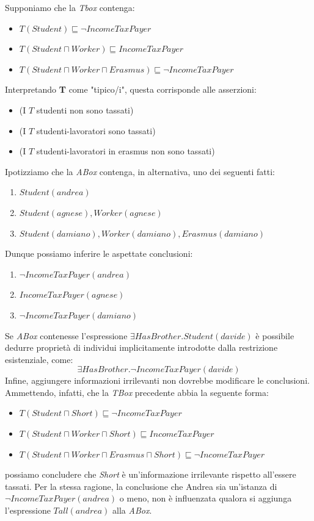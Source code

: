 Supponiamo che la \textit{Tbox} contenga:
\begin{itemize}
	\item[] $ T(Student) \sqsubseteq \neg IncomeTaxPayer$
	\item[] $ T(Student \sqcap Worker) \sqsubseteq IncomeTaxPayer$
	\item[] $ T(Student \sqcap Worker \sqcap Erasmus) \sqsubseteq \neg IncomeTaxPayer $
\end{itemize}
Interpretando \textbf{T} come "tipico/i", questa corrisponde alle asserzioni:
\begin{itemize}
	\item[] (I $T$ studenti non sono tassati)
	\item[] (I $T$ studenti-lavoratori sono tassati)
	\item[] (I $T$ studenti-lavoratori in erasmus non sono tassati)
\end{itemize}
Ipotizziamo che la \textit{ABox} contenga, in alternativa, uno dei seguenti fatti:
\begin{enumerate}
	\item $ Student(andrea) $
	\item $ Student(agnese), Worker(agnese) $
	\item $ Student(damiano), Worker(damiano), Erasmus(damiano) $
\end{enumerate}
Dunque possiamo inferire le aspettate conclusioni:
\begin{enumerate}
	\item $ \neg IncomeTaxPayer(andrea) $
	\item $ IncomeTaxPayer(agnese) $
	\item $ \neg IncomeTaxPayer(damiano) $
\end{enumerate}
Se \textit{ABox} contenesse l'espressione $ \exists HasBrother.Student(davide) $ è possibile dedurre
proprietà di individui implicitamente introdotte dalla restrizione esistenziale, come:
\[ \exists HasBrother.\neg IncomeTaxPayer(davide) \]
Infine, aggiungere informazioni irrilevanti non dovrebbe modificare le conclusioni.
Ammettendo, infatti, che la \textit{TBox} precedente abbia la seguente forma:
\begin{itemize}
	\item[] $ T(Student \sqcap Short) \sqsubseteq \neg IncomeTaxPayer$
	\item[] $ T(Student \sqcap Worker \sqcap Short) \sqsubseteq IncomeTaxPayer$
	\item[] $ T(Student \sqcap Worker \sqcap Erasmus \sqcap Short) \sqsubseteq \neg IncomeTaxPayer $
\end{itemize}
possiamo concludere che \textit{Short} è un’informazione irrilevante rispetto all'essere tassati.
Per la stessa ragione, la conclusione che Andrea sia un’istanza di\\
$ \neg IncomeTaxPayer(andrea)$ o meno, non è influenzata qualora si aggiunga l'espressione
$ Tall(andrea) $ alla \textit{ABox}.
\clearpage

